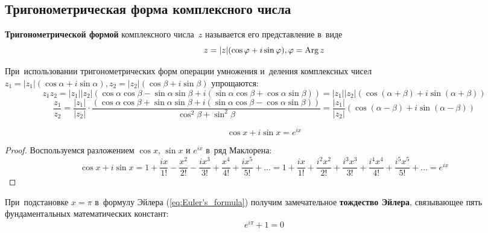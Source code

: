 \subsection{Тригонометрическая форма комплексного числа}
\textbf{Тригонометрической формой} комплексного числа~$z$ называется его представление в~виде
\begin{equation*}
z = |z|(\cos \varphi + i\sin \varphi), \varphi = \operatorname{Arg} z
\end{equation*}

При~использовании тригонометрических форм операции умножения и~деления комплексных чисел
$z_1 = |z_1|(\cos \alpha + i\sin \alpha), z_2 = |z_2|(\cos \beta + i\sin \beta)$ упрощаются:
\begin{equation*}
z_1 z_2 = |z_1| |z_2|(\cos \alpha \cos \beta - \sin \alpha \sin \beta + i(\sin \alpha \cos \beta + \cos \alpha \sin \beta)) =
|z_1| |z_2|(\cos (\alpha + \beta) + i\sin (\alpha + \beta))
\end{equation*}
\begin{equation*}
\frac{z_1}{z_2} = \frac{|z_1|}{|z_2|} \cdot
\frac{(\cos \alpha \cos \beta + \sin \alpha \sin \beta + i(\sin \alpha \cos \beta - \cos \alpha \sin \beta))}
{\cos^2 \beta + \sin^2 \beta} =
\frac{|z_1|}{|z_2|} (\cos (\alpha - \beta) + i\sin (\alpha - \beta))
\end{equation*}

\begin{theorem}
\label{eq:Euler's_formula}
\begin{equation*}
\cos x + i\sin x = e^{ix}
\end{equation*}
\end{theorem}
\begin{proof}
Воспользуемся разложением $\cos x$, $\sin x$ и $e^{ix}$ в~ряд Маклорена:
\begin{equation*}
\cos x + i\sin x = 1 + \frac{ix}{1!} - \frac{x^2}{2!} - \frac{ix^3}{3!} + \frac{x^4}{4!} + \frac{ix^5}{5!} + \ldots =
1 + \frac{ix}{1!} + \frac{i^2 x^2}{2!} + \frac{i^3 x^3}{3!} + \frac{i^4 x^4}{4!} + \frac{i^5 x^5}{5!} + \ldots = e^{ix}
\end{equation*}
\end{proof}

При~подстановке $x = \pi$ в~формулу Эйлера (\ref{eq:Euler's_formula}) получим замечательное \textbf{тождество Эйлера}, связывающее пять фундаментальных математических констант:
\begin{equation*}
e^{i\pi} + 1 = 0
\end{equation*}

